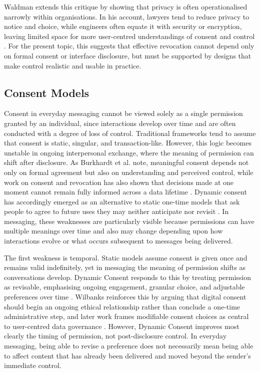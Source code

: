Waldman extends this critique by showing that privacy is often operationalised narrowly within organisations. In his account, lawyers tend to reduce privacy to notice and choice, while engineers often equate it with security or encryption, leaving limited space for more user-centred understandings of consent and control \cite{waldman_designing_nodate}. For the present topic, this suggests that effective revocation cannot depend only on formal consent or interface disclosure, but must be supported by designs that make control realistic and usable in practice.   

\subsection{Consent Models}

Consent in everyday messaging cannot be viewed solely as a single permission granted by an individual, since interactions develop over time and are often conducted with a degree of loss of control. Traditional frameworks tend to assume that consent is static, singular, and transaction-like. However, this logic becomes unstable in ongoing interpersonal exchange, where the meaning of permission can shift after disclosure. As Burkhardt et al. note, meaningful consent depends not only on formal agreement but also on understanding and perceived control, while work on consent and revocation has also shown that decisions made at one moment cannot remain fully informed across a data lifetime \cite{burkhardt_privacy_2023,agrafiotis_consent_revocation_2012}. Dynamic consent has accordingly emerged as an alternative to static one-time models that ask people to agree to future uses they may neither anticipate nor revisit \cite{schuler_scott_dynamic_consent_2022}. In messaging, these weaknesses are particularly visible because permissions can have multiple meanings over time and also may change depending upon how interactions evolve or what occurs subsequent to messages being delivered. 

The first weakness is temporal. Static models assume consent is given once and remains valid indefinitely, yet in messaging the meaning of permission shifts as conversations develop. Dynamic Consent responds to this by treating permission as revisable, emphasising ongoing engagement, granular choice, and adjustable preferences over time \cite{kaye_dynamic_2015,lee_identifying_2023}. Wilbanks reinforces this by arguing that digital consent should begin an ongoing ethical relationship rather than conclude a one-time administrative step, and later work frames modifiable consent choices as central to user-centred data governance \cite{wilbanks_design_2018}. However, Dynamic Consent improves most clearly the timing of permission, not post-disclosure control. In everyday messaging, being able to revise a preference does not necessarily mean being able to affect content that has already been delivered and moved beyond the sender's immediate control.

